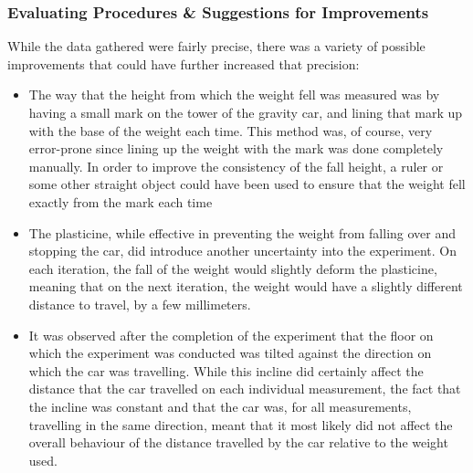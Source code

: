 \documentclass[titlepage,12pt]{article}
\begin{document}
\subsubsection{Evaluating Procedures \& Suggestions for Improvements}

While the data gathered were fairly precise, there was a variety of possible improvements
that could have further increased that precision:

\begin{itemize}
    \item The way that the height from which the weight fell was measured was by having a
        small mark on the tower of the gravity car, and  lining that mark up with the base
        of the weight each time. This method was, of course, very error-prone since lining
        up the weight with the mark was done completely manually. In order to improve the
        consistency of the fall height, a ruler or some other straight object could have
        been used to ensure that the weight fell exactly from the mark each time

    \item The plasticine, while effective in preventing the weight from falling over and
        stopping the car, did introduce another uncertainty into the experiment. On each
        iteration, the fall of the weight would slightly deform the plasticine, meaning that
        on the next iteration, the weight would have a slightly different distance to
        travel, by a few millimeters. 

    \item It was observed after the completion of the experiment that the floor on which the
        experiment was conducted was tilted against the direction on which the car was
        travelling. While this incline did certainly affect the distance that the car
        travelled on each individual measurement, the fact that the incline was constant and
        that the car was, for all measurements, travelling in the same direction, meant that
        it most likely did not affect the overall behaviour of the distance travelled by the
        car relative to the weight used.  
\end{itemize}
\end{document}
